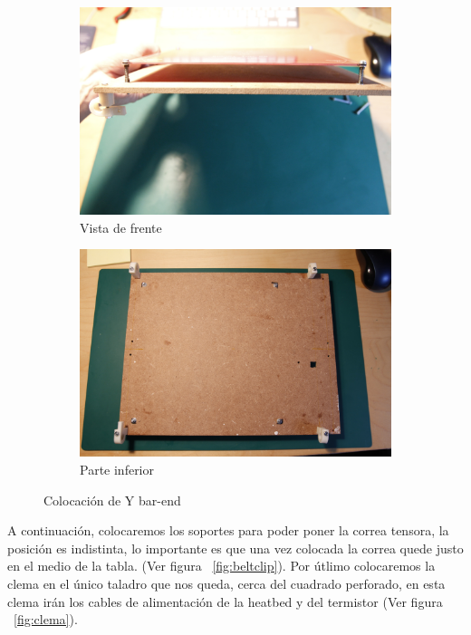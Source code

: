 		\begin{figure}[H]
		    \centering
		    \begin{subfigure}[b]{0.4\textwidth}
		        \centering
		        \includegraphics[width=\textwidth]{../../Fotos/39.jpg}
		        \caption{Vista de frente}
		        \label{fig:barend.frente}
		    \end{subfigure}
		    \begin{subfigure}[b]{0.4\textwidth}
		       \centering
		       \includegraphics[width=\textwidth]{../../Fotos/40.jpg}
		       \caption{Parte inferior}
		       \label{fig:barend.inferior}
		    \end{subfigure}
		    \caption{Colocación de Y bar-end}\label{fig:barend}
		\end{figure}
	A continuación, colocaremos los soportes para poder poner la correa tensora, la posición es indistinta, lo importante es que una vez colocada la correa quede justo en el medio de la tabla. (Ver figura ~\ref{fig:beltclip}). Por útlimo colocaremos la clema en el único taladro que nos queda, cerca del cuadrado perforado, en esta clema irán los cables de alimentación de la heatbed y del termistor (Ver figura ~\ref{fig:clema}).\\
